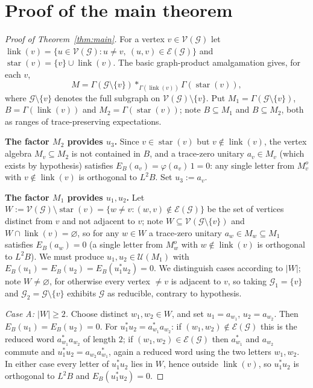 \documentclass[a4paper, 11pt, reqno]{amsart}
\numberwithin{equation}{section}
\theoremstyle{plain}
\theoremstyle{remark}
\theoremstyle{definition}
\newcommand{\VV}{{\mathcal V}}
\newcommand{\EE}{{\mathcal E}}
\newcommand{\GG}{{\mathcal G}}
\begin{document}
\section{Proof of the main theorem}

\begin{proof}[Proof of Theorem~\ref{thm:main}]
For a vertex $v\in\VV(\GG)$ let $\operatorname{link}(v)=\{u\in\VV(\GG):u\neq v,\ (u,v)\in\EE(\GG)\}$ and $\operatorname{star}(v)=\{v\}\cup\operatorname{link}(v)$. The basic graph-product amalgamation \cite{Gr90,CaFi17} gives, for each $v$,
\begin{equation}\label{eq:star-decomp}
M=\Gamma(\GG\setminus\{v\})*_{\Gamma(\operatorname{link}(v))}\Gamma(\operatorname{star}(v)),
\end{equation}
where $\GG\setminus\{v\}$ denotes the full subgraph on $\VV(\GG)\setminus\{v\}$. Put $M_1=\Gamma(\GG\setminus\{v\})$, $B=\Gamma(\operatorname{link}(v))$ and $M_2=\Gamma(\operatorname{star}(v))$; note $B\subseteq M_1$ and $B\subseteq M_2$, both as ranges of trace-preserving expectations.

\medskip\noindent\textbf{The factor $M_2$ provides $u_3$.}
Since $v\in\operatorname{star}(v)$ but $v\notin\operatorname{link}(v)$, the vertex algebra $M_v\subseteq M_2$ is not contained in $B$, and a trace-zero unitary $a_v\in M_v$ (which exists by hypothesis) satisfies $E_B(a_v)=\varphi(a_v)\,1=0$: any single letter from $M_v^o$ with $v\notin\operatorname{link}(v)$ is orthogonal to $L^2B$. Set $u_3:=a_v$.

\medskip\noindent\textbf{The factor $M_1$ provides $u_1,u_2$.}
Let $W:=\VV(\GG)\setminus\operatorname{star}(v)=\{w\neq v:(w,v)\notin\EE(\GG)\}$ be the set of vertices distinct from $v$ and not adjacent to $v$; note $W\subseteq\VV(\GG\setminus\{v\})$ and $W\cap\operatorname{link}(v)=\varnothing$, so for any $w\in W$ a trace-zero unitary $a_w\in M_w\subseteq M_1$ satisfies $E_B(a_w)=0$ (a single letter from $M_w^o$ with $w\notin\operatorname{link}(v)$ is orthogonal to $L^2B$). We must produce $u_1,u_2\in\mathcal U(M_1)$ with $E_B(u_1)=E_B(u_2)=E_B(u_1^*u_2)=0$. We distinguish cases according to $|W|$; note $W\neq\varnothing$, for otherwise every vertex $\neq v$ is adjacent to $v$, so taking $\GG_1=\{v\}$ and $\GG_2=\GG\setminus\{v\}$ exhibits $\GG$ as reducible, contrary to hypothesis.

\emph{Case A: $|W|\ge2$.} Choose distinct $w_1,w_2\in W$, and set $u_1=a_{w_1}$, $u_2=a_{w_2}$. Then $E_B(u_1)=E_B(u_2)=0$. For $u_1^*u_2=a_{w_1}^*a_{w_2}$: if $(w_1,w_2)\notin\EE(\GG)$ this is the reduced word $a_{w_1}^*a_{w_2}$ of length $2$; if $(w_1,w_2)\in\EE(\GG)$ then $a_{w_1}^*$ and $a_{w_2}$ commute and $u_1^*u_2=a_{w_2}a_{w_1}^*$, again a reduced word using the two letters $w_1,w_2$. In either case every letter of $u_1^*u_2$ lies in $W$, hence outside $\operatorname{link}(v)$, so $u_1^*u_2$ is orthogonal to $L^2B$ and $E_B(u_1^*u_2)=0$.


\end{proof}
\end{document}
